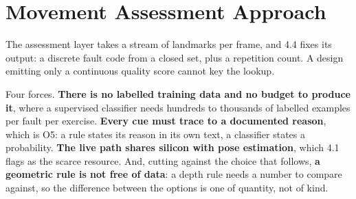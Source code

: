 \section{Movement Assessment Approach}
\label{sec:4.5}

The assessment layer takes a stream of landmarks per frame, and 4.4 fixes its output: a discrete fault code from a closed set, plus a repetition count. A design emitting only a continuous quality score cannot key the lookup.

Four forces. \textbf{There is no labelled training data and no budget to produce it}, where a supervised classifier needs hundreds to thousands of labelled examples per fault per exercise. \textbf{Every cue must trace to a documented reason}, which is O5: a rule states its reason in its own text, a classifier states a probability. \textbf{The live path shares silicon with pose estimation}, which 4.1 flags as the scarce resource. And, cutting against the choice that follows, \textbf{a geometric rule is not free of data}: a depth rule needs a number to compare against, so the difference between the options is one of quantity, not of kind.

